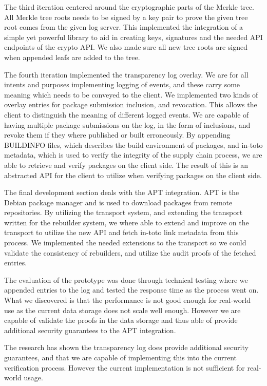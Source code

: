 \documentclass[../Main/thesis.tex]{subfiles}
\begin{document}
The third iteration centered around the cryptographic parts of the Merkle tree.
All Merkle tree roots needs to be signed by a key pair to prove the given tree
root comes from the given log server. This implemented the integration of a
simple yet powerful library to aid in creating keys, signatures and the needed
API endpoints of the crypto API. We also made sure all new tree roots are signed
when appended leafs are added to the tree.

The fourth iteration implemented the transparency log overlay. We are for all
intents and purposes implementing logging of events, and these carry some
meaning which needs to be conveyed to the client. We implemented two kinds of
overlay entries for package submission inclusion, and revocation. This allows
the client to distinguish the meaning of different logged events. We are capable
of having multiple package submissions on the log, in the form of inclusions,
and revoke them if they where published or built erroneously. By appending
BUILDINFO files, which describes the build environment of packages, and in-toto
metadata, which is used to verify the integrity of the supply chain process, we
are able to retrieve and verify packages on the client side.  The result of this
is an abstracted API for the client to utilize when verifying packages on the
client side.

The final development section deals with the APT integration. APT is the Debian
package manager and is used to download packages from remote repositories. By
utilizing the transport system, and extending the transport written for the
rebuilder system, we where able to extend and improve on the transport to
utilize the new API and fetch in-toto link metadata from this process. We
implemented the needed extensions to the transport so we could validate the
consistency of rebuilders, and utilize the audit proofs of the fetched entries.

The evaluation of the prototype was done through technical testing where we
appended entries to the log and tested the response time as the process went on.
What we discovered is that the performance is not good enough for real-world use
as the current data storage does not scale well enough. However we are capable
of validate the proofs in the data storage and thus able of provide additional
security guarantees to the APT integration.

The research has shown the transparency log does provide additional security
guarantees, and that we are capable of implementing this into the current
verification process. However the current implementation is not sufficient for
real-world usage.
\end{document}
